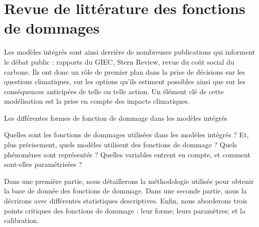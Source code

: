 \chapter{Revue de littérature des fonctions de dommages}
\label{chapter:litrev}


Les modèles intégrés sont ainsi derrière de nombreuses publications qui informent le débat public : rapports du GIEC, Stern Review, revue du coût social du carbone. Ils ont donc un rôle de premier plan dans la prise de décisions sur les questions climatiques, sur les options qu'ils estiment possibles ainsi que sur les conséquences anticipées de telle ou telle action. Un élément clé de cette modélisation est la prise en compte des impacts climatiques. 



Les différentes formes de fonction de dommage dans les modèles intégrés

Quelles sont les fonctions de dommages utilisées dans les modèles intégrés ? Et, plus précisement, quels modèles utilisent des fonctions de dommage ? Quels phénomènes sont représentés ? Quelles variables entrent en compte, et comment sont-elles paramétrisées ? 

Dans une première partie, nous détaillerons la méthodologie utilisée pour obtenir la base de donnée des fonctions de dommage. Dans une seconde partie, nous la décrirons avec différentes statistiques descriptives. Enfin, nous aborderons trois points critiques des fonctions de dommage : leur forme; leurs paramètres; et la calibration. 

